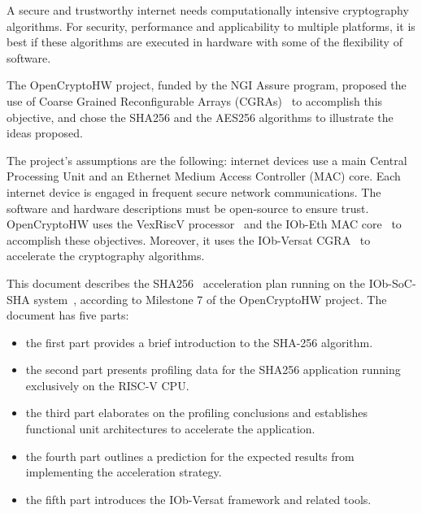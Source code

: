 A secure and trustworthy internet needs computationally intensive cryptography
algorithms. For security, performance and applicability to multiple platforms,
it is best if these algorithms are executed in hardware with some of the
flexibility of software.

The OpenCryptoHW project, funded by the NGI Assure program, proposed the use of
Coarse Grained Reconfigurable Arrays (CGRAs)~\cite{CGRA:Overview} to accomplish
this objective, and chose the SHA256 and the AES256 algorithms to illustrate
the ideas proposed.

The project's assumptions are the following: internet devices use a main
Central Processing Unit and an Ethernet Medium Access Controller (MAC) core.
Each internet device is engaged in frequent secure network communications. The
software and hardware descriptions must be open-source to ensure trust. 
OpenCryptoHW uses the VexRiscV processor~\cite{VexRiscv} and the IOb-Eth MAC
core~\cite{iob-eth} to accomplish these objectives. Moreover, it uses the
IOb-Versat CGRA~\cite{iob-versat} to accelerate the cryptography algorithms.

This document describes the SHA256~\cite{SHA_NIST_FIPS} acceleration plan
running on the IOb-SoC-SHA system~\cite{iob-soc-sha}, according to Milestone 7
of the OpenCryptoHW project. The document has five parts:
\begin{itemize}
\item the first part provides a brief introduction to the SHA-256 algorithm.
\item the second part presents profiling data for the SHA256 application
    running exclusively on the RISC-V CPU.
\item the third part elaborates on the profiling conclusions and establishes
    functional unit architectures to accelerate the application.
\item the fourth part outlines a prediction for the expected results from
    implementing the acceleration strategy.
\item the fifth part introduces the IOb-Versat framework and related tools.
\end{itemize}









